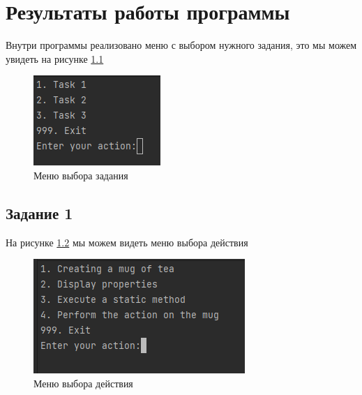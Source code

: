 \chapter{Результаты работы программы}

Внутри программы реализовано меню с выбором нужного задания, это мы можем увидеть на рисунке \ref{fig:tasks}

\begin{figure}
	\centering
	\includegraphics{inc/1}
	\caption{Меню выбора задания}
	\label{fig:tasks}
\end{figure}

\section{Задание 1}

На рисунке \ref{fig:1actions} мы можем видеть меню выбора действия

\begin{figure}
	\centering
	\includegraphics{inc/2}
	\caption{Меню выбора действия}
	\label{fig:1actions}
\end{figure}
